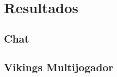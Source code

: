 \chapter{Resultados}
\label{sec:resultados}

\section{Chat}
\label{sec:resultados:chat}

\section{Vikings Multijogador}
\label{sec:resultados:vikings}
